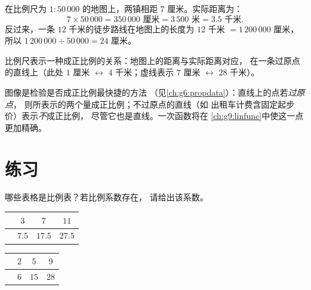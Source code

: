 \begin{example}\label{ex:g7:prop:scale}
在比例尺为 $1 : 50\,000$ 的地图上，两镇相距 $7$ 厘米。实际距离为：
\[
7 \times 50\,000 = 350\,000 \text{ 厘米} = 3\,500 \text{ 米} = 3.5
\text{ 千米}.
\]
反过来，一条 $12$ 千米的徒步路线在地图上的长度为
$12$ 千米 $= 1\,200\,000$ 厘米，所以 $1\,200\,000 \div 50\,000 = 24$ 厘米。
\end{example}

\begin{omfigure}

{\small 比例尺表示一种成正比例的关系：地图上的距离与实际距离对应，
在一条过原点的直线上（此处
$1$ 厘米 $\leftrightarrow$ $4$ 千米；虚线表示 $7$ 厘米
$\leftrightarrow$ $28$ 千米）。}
\end{omfigure}

\begin{remark}
图像是检验是否成正比例最快捷的方法
（见\cref{ch:g6:propdata}）：直线上的点若\emph{过原点}，
则所表示的两个量成正比例；不过原点的直线（如
出租车计费含固定起步价）表示\emph{不}成正比例，
尽管它也是直线。一次函数将在
\cref{ch:g9:linfunc}中使这一点更加精确。
\end{remark}

\section{练习}

\begin{exercise}[$\star$]\label{exo:g7:prop:1}
哪些表格是比例表？若比例系数存在，
请给出该系数。
\begin{center}
\renewcommand{\arraystretch}{1.2}
\begin{tabular}{l|ccc}
 & $3$ & $7$ & $11$ \\
\hline
 & $7.5$ & $17.5$ & $27.5$ \\
\end{tabular}
\qquad
\begin{tabular}{l|ccc}
 & $2$ & $5$ & $9$ \\
\hline
 & $6$ & $15$ & $28$ \\
\end{tabular}
\end{center}
\end{exercise}

